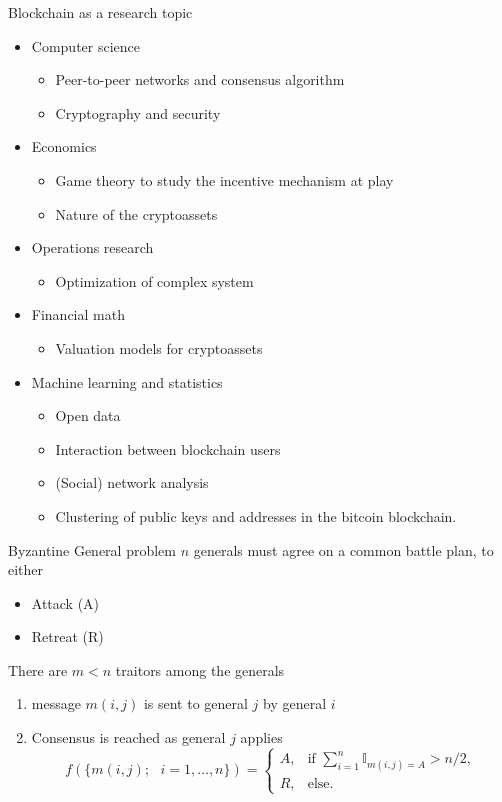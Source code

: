 \documentclass{beamer}
\begin{document}
\begin{frame}{Blockchain as a research topic}
\begin{itemize}
  \item Computer science
  \begin{itemize}
  \item Peer-to-peer networks and consensus algorithm
  \item Cryptography and security
  \end{itemize}
  \item Economics  
  \begin{itemize}
  \item Game theory to study the incentive mechanism at play
  \item Nature of the cryptoassets
  \end{itemize}
  \item Operations research  
  \begin{itemize}
  \item Optimization of complex system
  \end{itemize}
  \item Financial math  
  \begin{itemize}
  \item Valuation models for cryptoassets
  \end{itemize}
  \item Machine learning and statistics  
  \begin{itemize}
  \item Open data
  \item Interaction between blockchain users
  \item (Social) network analysis
  \item Clustering of public keys and addresses in the bitcoin blockchain.
  \end{itemize}
\end{itemize}

\end{frame}
\appendix
\begin{frame}{Byzantine General problem}
    $n$ generals must agree on a common battle plan, to either 
    \begin{itemize}
    \item Attack (A) 
    \item Retreat (R)
  \end{itemize}
\begin{tcolorbox}[enhanced,drop shadow, title=Problem]
There are $m<n$ traitors among the generals
\end{tcolorbox}
\begin{enumerate}
\item message $m(i,j)$ is sent to general $j$ by general $i$ 
\item Consensus is reached as general $j$ applies 
$$
f(\{m(i,j);\text{ }i = 1,\ldots,n\}) = \begin{cases}
A,& \text{if }\sum_{i = 1}^n\mathbb{I}_{m(i,j) =A} >n/2,\\
R, &\text{else}.
\end{cases}
$$
\end{enumerate}
\end{frame}
\end{document}
